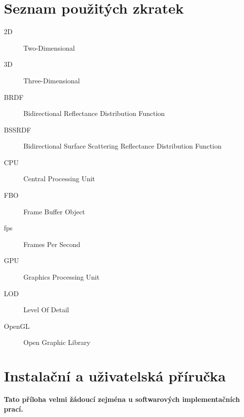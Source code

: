\documentclass[11pt,twoside,a4paper]{book}
\begin{document}

\listoftables



\appendix

\chapter{Seznam použitých zkratek}

\begin{description}
\item[2D] 		Two-Dimensional
\item[3D] 		Three-Dimensional
\item[BRDF] 	Bidirectional Reflectance Distribution Function
\item[BSSRDF] 	Bidirectional Surface Scattering Reflectance Distribution Function
\item[CPU] 		Central Processing Unit
\item[FBO]		Frame Buffer Object
\item[fps] 		Frames Per Second
\item[GPU] 		Graphics Processing Unit
\item[LOD]		Level Of Detail
\item[OpenGL] 	Open Graphic Library

\end{description}


\chapter{Instalační a uživatelská příručka}
\textbf{\large Tato příloha velmi žádoucí zejména u softwarových implementačních prací.}
\end{document}
